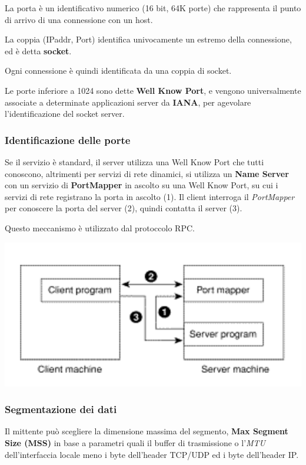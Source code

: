         La porta è un identificativo numerico (16 bit, 64K porte) che rappresenta il punto di arrivo di una connessione con un host.

        La coppia (IPaddr, Port) identifica univocamente un estremo della connessione, ed è detta \textbf{socket}.

        Ogni connessione è quindi identificata da una coppia di socket.

        Le porte inferiore a 1024 sono dette \textbf{Well Know Port}, e vengono universalmente associate a determinate applicazioni server da \textbf{IANA}, per agevolare l'identificazione del socket server.

        \subsubsection{Identificazione delle porte}
            Se il servizio è standard, il server utilizza una Well Know Port che tutti conoscono, altrimenti per servizi di rete dinamici, si utilizza un \textbf{Name Server} con un servizio di \textbf{PortMapper} in ascolto su una Well Know Port, su cui i servizi di rete registrano la porta in ascolto (1). Il client interroga il \textit{PortMapper} per conoscere la porta del server (2), quindi contatta il server (3).
        
            Questo meccanismo è utilizzato dal protoccolo RPC.

            \begin{center}
                \includegraphics[scale=0.45]{chapters/5/assets/schema_b.png}
            \end{center}

        \subsubsection{Segmentazione dei dati}
            Il mittente può scegliere la dimensione massima del segmento, \textbf{Max Segment Size (MSS)} in base a parametri quali il buffer di trasmissione o l'\textit{MTU} dell'interfaccia locale meno i byte dell'header TCP/UDP ed i byte dell'header IP.
        
